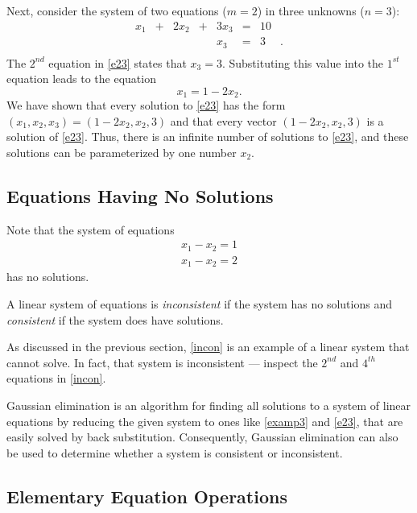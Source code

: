 \documentclass{ximera}
\begin{document}
Next, consider the system of two equations ($m=2$) in three
unknowns ($n=3$):
\begin{equation}  \label{e23}
\begin{array}{rcrcrcrl}
  x_1 & + & 2x_2 & + & 3x_3 & = &  10  & \\
      &   &      &   &  x_3 & = &   3  & \! . \\
\end{array}
\end{equation}
The $2^{nd}$ equation in \eqref{e23} states that $x_3=3$.
Substituting
this value into the $1^{st}$ equation leads to the equation
\[
x_1 = 1-2x_2.
\]
We have shown that every solution to \eqref{e23} has the form
$(x_1,x_2,x_3)=(1-2x_2,x_2,3)$ and that every vector
$(1-2x_2,x_2,3)$ is a solution of \eqref{e23}.  Thus, there is an
infinite number of solutions to \eqref{e23}, and these solutions
can be parameterized by one number $x_2$.

\subsection*{Equations Having No Solutions}

Note that the system of equations
\begin{eqnarray*}
x_1 - x_2 = 1\\
x_1 - x_2 = 2
\end{eqnarray*}
has no solutions.

\begin{definition}
A linear system of equations is {\em inconsistent\/} if the
system has no solutions and {\em consistent\/} if the system
does have solutions.
\end{definition}  

As discussed in the previous section, \eqref{incon} is an example
of a linear system that \Matlab cannot solve.  In fact, that
system is inconsistent --- inspect the $2^{nd}$ and $4^{th}$
equations in \eqref{incon}.

Gaussian elimination is an algorithm for finding all solutions
to a system of linear equations by reducing the given system to
ones like \eqref{examp3} and \eqref{e23}, that are easily solved by
back substitution.  Consequently, Gaussian elimination can also be
used to determine whether a system is consistent or inconsistent.

\subsection*{Elementary Equation Operations}
\end{document}
